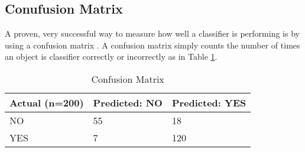 \subsection*{Conufusion Matrix}
A proven, very successful way to measure how well a classifier is performing is by using a confusion matrix \parencite{handsOnML}.
A confusion matrix simply counts the number of times an object is classifier correctly or incorrectly as in Table \ref{cm}.

\begin{table}[]
\centering
\caption{Confusion Matrix}
\label{cm}
\begin{tabular}{|l|l|l|}
\hline
\textbf{Actual (n=200)} & \textbf{Predicted: NO} & \textbf{Predicted: YES} \\ \hline
NO                      & 55                     & 18                      \\ \hline
YES                     & 7                      & 120                     \\ \hline
\end{tabular}
\end{table}

